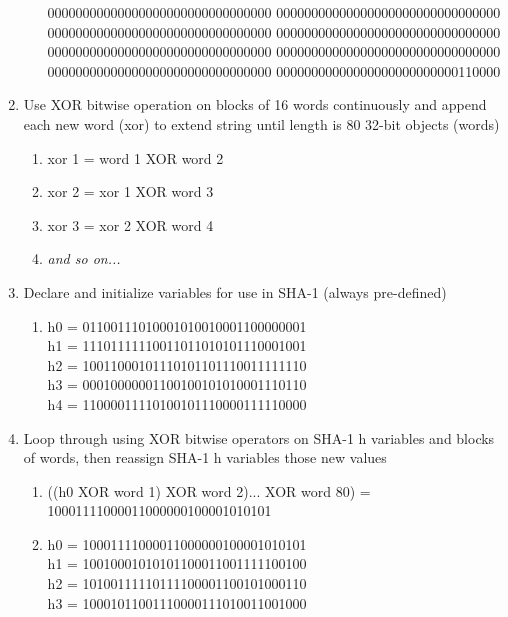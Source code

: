\documentclass[12pt]{extarticle}
\begin{document}
\begin{enumerate}
\begin{enumerate}
        00000000000000000000000000000000 00000000000000000000000000000000\\
        00000000000000000000000000000000 00000000000000000000000000000000\\
        00000000000000000000000000000000 00000000000000000000000000000000\\
        00000000000000000000000000000000 00000000000000000000000000110000
    \end{enumerate}
  \item Use XOR bitwise operation on blocks of 16 words continuously and append each new word (xor) to extend string until length is 80 32-bit objects (words)
       \begin{enumerate}
        \item xor 1 = word 1 XOR word 2
        \item xor 2 = xor 1 XOR word 3
        \item xor 3 = xor 2 XOR word 4
        \item {\slshape{and so on...}}
    \end{enumerate}
  \item Declare and initialize variables for use in SHA-1 (always pre-defined)
      \begin{enumerate}
        \item   h0 = 01100111010001010010001100000001\\
                h1 = 11101111110011011010101110001001\\
                h2 = 10011000101110101101110011111110\\
                h3 = 00010000001100100101010001110110\\
                h4 = 11000011110100101110000111110000\\
    \end{enumerate}
  \item Loop through using XOR bitwise operators on SHA-1 h variables and blocks of words, then reassign SHA-1 h variables those new values
      \begin{enumerate}
        \item   ((h0 XOR word 1) XOR word 2)... XOR word 80) = 10001111000011000000100001010101
        \item   h0 = 10001111000011000000100001010101\\
                h1 = 10010001010101100011001111100100\\
                h2 = 10100111110111100001100101000110\\
                h3 = 10001011001110000111010011001000\\

\end{enumerate}
\end{enumerate}
\end{document}

